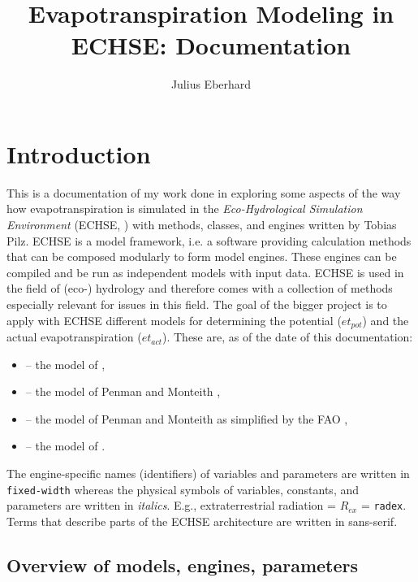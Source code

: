 \documentclass{scrreprt}
\title{Evapotranspiration Modeling in ECHSE: Documentation}
\author{Julius Eberhard}
\newenvironment{denseitem}{
  \begin{itemize}
    \setlength{\itemsep}{0pt}
    \setlength{\parskip}{0pt}
    \setlength{\parsep}{0pt}
}{
  \end{itemize}
}
\begin{document}
\maketitle
\tableofcontents


\chapter{Introduction} \label{ch:introduction}

This is a documentation of my work done in exploring some aspects of the way how evapotranspiration is simulated in the \emph{Eco-Hydrological Simulation Environment} (ECHSE, \citealt{kneis15}) with methods, classes, and engines written by Tobias Pilz.
ECHSE is a model framework, i.e. a software providing calculation methods that can be composed modularly to form model engines. These engines can be compiled and be run as independent models with input data.
ECHSE is used in the field of (eco-) hydrology and therefore comes with a collection of methods especially relevant for issues in this field.
The goal of the bigger project is to apply with ECHSE different models for determining the potential ($et_{pot}$) and the actual evapotranspiration ($et_{act}$).
These are, as of the date of this documentation:
\begin{denseitem}
  \item[--] the model of \citet{makkink57},
  \item[--] the model of Penman and Monteith \citep{monteith65},
  \item[--] the model of Penman and Monteith as simplified by the FAO \citep{fao98},
  \item[--] the model of \citet{shuttleworth85}.
\end{denseitem}

The engine-specific names (identifiers) of variables and parameters are written in \verb!fixed-width! whereas the physical symbols of variables, constants, and parameters are written in \textit{italics}.
E.g., extraterrestrial radiation = $R_{ex}$ = \verb!radex!.
Terms that describe parts of the ECHSE architecture are written in \textsf{sans-serif}.

\section{Overview of models, engines, parameters} \label{sec:intro_overview}
\end{document}
